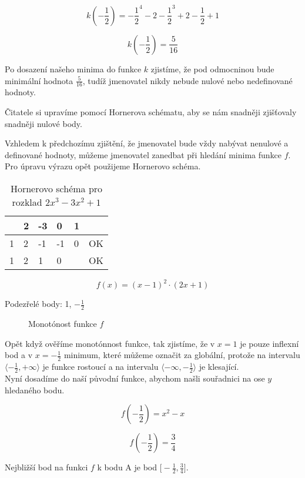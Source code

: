 \begin{displaymath}
k(-\frac{1}{2})=-\frac{1}{2}^4 -2-\frac{1}{2}^3 + 2-\frac{1}{2} + 1
\end{displaymath}

\begin{displaymath}
k(-\frac{1}{2})=\frac{5}{16}
\end{displaymath}

Po dosazení našeho minima do funkce \(k\) zjistíme, že pod odmocninou bude minimální hodnota \(\frac{5}{16}\), tudíž jmenovatel nikdy nebude nulové nebo nedefinované hodnoty.

Čitatele si upravíme pomocí Hornerova schématu, aby se nám snadněji zjišťovaly snadněji nulové body.

Vzhledem k předchozímu zjištění, že jmenovatel bude vždy nabývat nenulové a definované hodnoty, můžeme jmenovatel zanedbat při hledání minima funkce \(f\).\\

Pro úpravu výrazu opět použijeme Hornerovo schéma.

\begin{table}[!h]
\centering
\begin{tabular}{l||l|l|l|l|l}
	 & 2 & -3 &  0 & 1 &    \\ \hline\hline
   1 & 2 & -1 & -1 & 0 & OK \\ \hline
   1 & 2 &  1 &  0 &   & OK \\
\end{tabular}
\caption{Hornerovo schéma pro rozklad $2x^3 - 3x^2 + 1$}
\end{table}

\begin{displaymath}
f(x)=(x-1)^2\cdot (2x +1)
\end{displaymath}

Podezřelé body: 1, \(-\frac{1}{2}\)

\begin{figure}[H]
	\centering
	
	\caption{Monotónost funkce \(f\)}
\end{figure}

Opět když ověříme monotónnost funkce, tak zjistíme, že v $x=1$ je pouze inflexní bod a v $x=-\frac{1}{2}$ minimum, 
které můžeme označit za globální, protože na intervalu \(\langle-\frac{1}{2},+\infty\rangle\) je funkce rostoucí 
a na intervalu \(\langle-\infty,-\frac{1}{2}\rangle\) je klesající.\\
Nyní dosadíme do naší původní funkce, abychom našli souřadnici na ose \(y\) hledaného bodu.

\begin{displaymath}
f(-\frac{1}{2})= x^2 - x
\end{displaymath}

\begin{displaymath}
f(-\frac{1}{2})= \frac{3}{4}
\end{displaymath}

Nejbližší bod na funkci $f$ k bodu A je bod $\big[-\frac{1}{2}, \frac{3}{4}\big]$.
